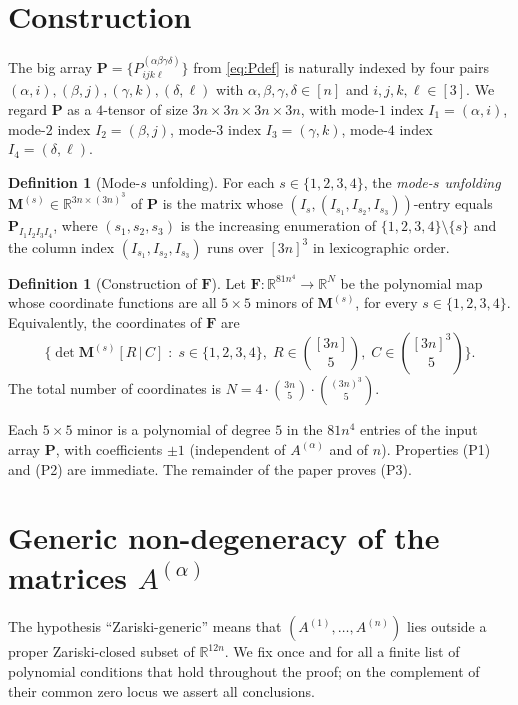 \documentclass[12pt]{article}
\theoremstyle{definition}
\newtheorem{definition}[theorem]{Definition}
\begin{document}
\section{Construction}\label{sec:construction}

The big array $\mathbf{P}=\{P^{(\alpha\beta\gamma\delta)}_{ijk\ell}\}$ from \eqref{eq:Pdef} is
naturally indexed by four pairs $(\alpha,i),(\beta,j),(\gamma,k),(\delta,\ell)$ with
$\alpha,\beta,\gamma,\delta\in[n]$ and $i,j,k,\ell\in[3]$. We regard $\mathbf{P}$ as a
$4$-tensor of size $3n\times 3n\times 3n\times 3n$, with mode-$1$ index $I_1=(\alpha,i)$,
mode-$2$ index $I_2=(\beta,j)$, mode-$3$ index $I_3=(\gamma,k)$, mode-$4$ index
$I_4=(\delta,\ell)$.

\begin{definition}[Mode-$s$ unfolding]\label{def:unfold}
For each $s\in\{1,2,3,4\}$, the \emph{mode-$s$ unfolding} $\mathbf{M}^{(s)}\in\mathbb{R}^{3n\times(3n)^3}$
of $\mathbf{P}$ is the matrix whose $(I_s,(I_{s_1},I_{s_2},I_{s_3}))$-entry equals
$\mathbf{P}_{I_1 I_2 I_3 I_4}$, where $(s_1,s_2,s_3)$ is the increasing enumeration of
$\{1,2,3,4\}\setminus\{s\}$ and the column index $(I_{s_1},I_{s_2},I_{s_3})$ runs over
$[3n]^3$ in lexicographic order.
\end{definition}

\begin{definition}[Construction of $\mathbf{F}$]\label{def:F}
Let $\mathbf{F}:\mathbb{R}^{81n^4}\to\mathbb{R}^N$ be the polynomial map whose coordinate
functions are all $5\times 5$ minors of $\mathbf{M}^{(s)}$, for every $s\in\{1,2,3,4\}$.
Equivalently, the coordinates of $\mathbf{F}$ are
\[
\bigl\{\det \mathbf{M}^{(s)}[R\,|\,C]\;:\;s\in\{1,2,3,4\},\;R\in\binom{[3n]}{5},\;C\in\binom{[3n]^3}{5}\bigr\}.
\]
The total number of coordinates is
$N=4\cdot\binom{3n}{5}\cdot\binom{(3n)^3}{5}$.
\end{definition}

Each $5\times 5$ minor is a polynomial of degree $5$ in the $81n^4$ entries of the input
array $\mathbf{P}$, with coefficients $\pm 1$ (independent of $A^{(\alpha)}$ and of $n$).
Properties (P1) and (P2) are immediate. The remainder of the paper proves (P3).

\section{Generic non-degeneracy of the matrices $A^{(\alpha)}$}\label{sec:generic}

The hypothesis ``Zariski-generic'' means that $(A^{(1)},\ldots,A^{(n)})$ lies outside a
proper Zariski-closed subset of $\mathbb{R}^{12n}$. We fix once and for all a finite list
of polynomial conditions that hold throughout the proof; on the complement of their
common zero locus we assert all conclusions.
\end{document}
